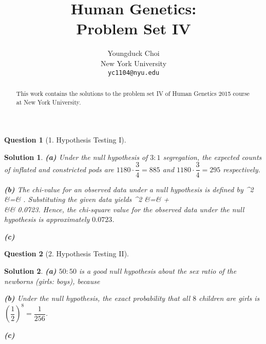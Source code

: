 \documentclass{article} %
\title{Human Genetics: \\
Problem Set IV}
\author{
Youngduck Choi \\
New York University\\
\texttt{yc1104@nyu.edu} \\
}
\def\eQb#1\eQe{\begin{eqnarray*}#1\end{eqnarray*}}
\theoremstyle{quest}
\newtheorem*{question}{Question}
\newtheorem*{solution}{Solution}
\begin{document}
\maketitle

\begin{abstract}
This work contains the solutions to the problem set IV
of Human Genetics 2015 course at New York University.
\end{abstract}

\bigskip

\begin{question}[1. Hypothesis Testing I]
\end{question}
\begin{solution}
\textbf{(a)} Under the null hypothesis of $3:1$ segregation, the expected counts of inflated
and constricted pods are $1180 \cdot \dfrac{3}{4} = 885$ and $1180 \cdot \dfrac{3}{4} = 295$
respectively.

\smallskip

\textbf{(b)} The chi-value for an observed data under a null hypothesis is defined by
\eQb
\chi^2 &=& \sum {}.
\eQe
Substituting the given data yields
\eQb
\chi^2 &=&  +  \\
&\approx& 0.0723. 
\eQe
Hence, the chi-square value for the observed data under the null hypothesis is
approximately $0.0723$. 

\smallskip

\textbf{(c)} 

\end{solution}

\bigskip

\begin{question}[2. Hypothesis Testing II]
\end{question}
\begin{solution}
\textbf{(a)} $50:50$ is a good null hypothesis about the sex ratio of the newborns (girls: boys),
because 

\smallskip

\textbf{(b)} Under the null hypothesis, the exact probability that all $8$ children are girls 
is $(\dfrac{1}{2})^8 = \dfrac{1}{256}$.

\smallskip

\textbf{(c)} 

\smallskip

\end{solution}

\bigskip
\end{document}
